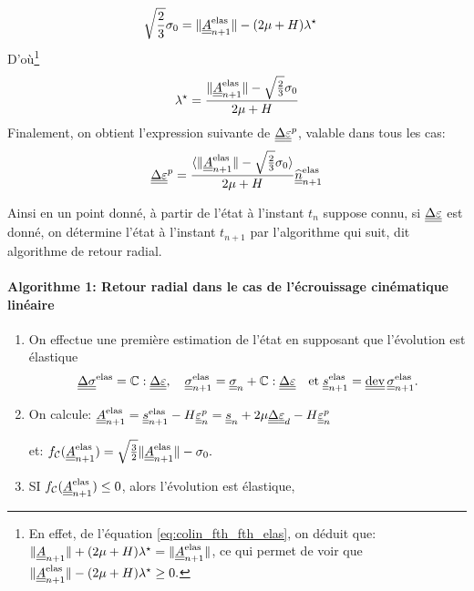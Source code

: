 \documentclass[10pt]{book}
\newcommand{\FthEpsp}{\ten{A}}
\begin{document}
\begin{appendices}
\begin{Demo}
{$$\begin{aligned}
\sqrt{\frac{2}{3}}\sigma_{0}&=\Vert\FthEpsp_{n+1}^{\text{elas}}\Vert-(2\mu+H)\lambda^{\star}
\end{aligned}$$
D'où\footnote{ En effet, de l'équation \eqref{eq:colin_fth_fth_elas}, on déduit que: $\Vert \FthEpsp_{n+1}\Vert+(2\mu+H)\lambda^{\star}=\Vert\FthEpsp_{n+1}^{\text{elas}}\Vert$, ce qui permet de voir que $\Vert\FthEpsp_{n+1}^{\text{elas}}\Vert-(2\mu+H)\lambda^{\star}\geq 0.$}
$$ \lambda^{\star}=\frac{\Vert \FthEpsp_{n+1}^{\text{elas}}\Vert-\sqrt{\frac{2}{3}}\sigma_{0}}{2\mu+H}$$
Finalement, on obtient l'expression suivante de $\underline{\underline{\Delta}}\underline{\underline{\varepsilon}}^{p}$, valable dans tous les cas:
\begin{equation}
\DeltaEpsP=\frac{\langle\Vert\FthEpsp_{n+1}^{\text{elas}}\Vert-\sqrt{\frac{2}{3}}\sigma_{0}\rangle}{2\mu+H}\hat{\ten{n}}_{n+1}^{\text{elas}}
\label{eq:Correction_plastique_incre}
\end{equation}
}\end{Demo}
Ainsi en un point donné, à partir de l'état à l'instant $t_{n}$ suppose connu, si $\underline{\underline{\Delta}}\underline{\underline{\varepsilon}}$ est donné, on détermine l'état à l'instant $t_{n+1}$ par l'algorithme qui suit, dit algorithme de retour radial.
\paragraph{Algorithme 1: Retour radial dans le cas de l'écrouissage cinématique linéaire\\}
\begin{enumerate}
\item On effectue une première estimation de l'état en supposant que l'évolution est élastique
$$\DeltaSC^{\text{elas}}=\RigiLin:\DeltaDefoHPP, \quad \SC_{n+1}^{\text{elas}}=\SC_{n}+\RigiLin:\DeltaDefoHPP \quad \text{et} \; \devia^{\text{elas}}_{n+1}=\dev\SC^{\text{elas}}_{n+1}.$$
\item On calcule: $\FthEpsp_{n+1}^{\text{elas}}=\devia_{n+1}^{\text{elas}}-H\DefoHPP_{n}^{p}=\devia_{n}+2\mu\DeltaDefoHPP_{d}-H\DefoHPP^{p}_{n}$
\begin{center}
et: $\FChargeConvexe(\FthEpsp_{n+1}^{\text{elas}})=\sqrt{\frac{3}{2}}\Vert\FthEpsp_{n+1}^{\text{elas}}\Vert-\sigma_{0}.$
\end{center}
\item SI $\FChargeConvexe(\FthEpsp_{n+1}^{\text{elas}})\leq 0$, alors l'évolution est élastique,\\


\end{enumerate}
\end{appendices}
\end{document}
